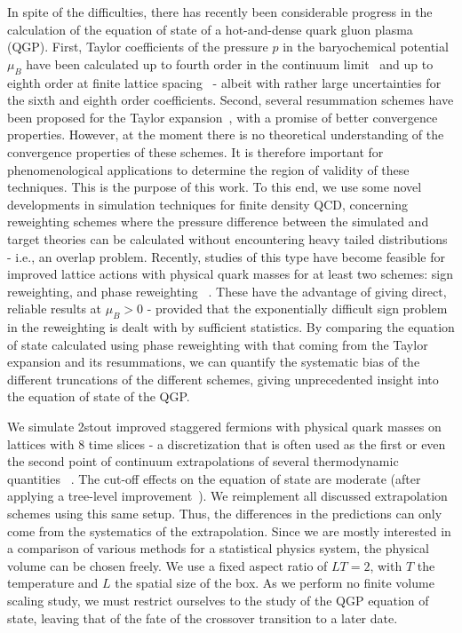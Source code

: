\documentclass[twocolumn,showpacs,preprintnumbers,amsmath,amssymb,latexsym,prl,footinbib,floatfix,superscriptaddress]{revtex4-2}
\begin{document}
In spite of the difficulties, there has recently been considerable 
progress in the calculation of the equation of state 
of a hot-and-dense quark gluon plasma (QGP). First, Taylor 
coefficients of the pressure $p$ in the baryochemical potential
$\mu_B$ have been calculated up to fourth order in the 
continuum limit~\cite{Borsanyi:2012cr, Bellwied:2015lba, Bazavov:2017dus} and 
up to eighth order at finite lattice 
spacing~\cite{DElia:2016jqh,Borsanyi:2018grb,Bazavov:2020bjn} - albeit 
with rather large uncertainties for the sixth and eighth order coefficients. 
Second, several resummation schemes have been proposed  
for the Taylor 
expansion~\cite{Borsanyi:2021sxv,Mondal:2021jxk,Mitra:2022vtf,Bollweg:2022rps,
Borsanyi:2022qlh}, with a promise of better convergence 
properties. However, at the moment there is no
theoretical understanding of the convergence properties of these 
schemes.  
It is therefore important for phenomenological applications to 
determine the region of validity of these techniques.
This is the purpose of this work. 
To this end, we use some 
novel developments in simulation techniques 
for finite density QCD, concerning reweighting 
schemes where the pressure difference between the simulated and 
target theories  can be calculated without 
encountering heavy tailed 
distributions - i.e., an overlap problem. Recently, 
studies of this type have become feasible 
for improved lattice actions with physical quark masses 
for at least two schemes: sign 
reweighting, and phase reweighting 
~\cite{Giordano:2020roi, Borsanyi:2021hbk}.
These have the advantage of giving 
direct, reliable results at $\mu_B>0$ - provided that the 
exponentially difficult sign problem in the 
reweighting is dealt with by sufficient statistics. 
By comparing the equation of state calculated using phase 
reweighting with that coming from the Taylor expansion and 
its resummations, we can 
quantify the systematic bias of the different 
truncations of the different schemes,
giving unprecedented insight into the equation of state of 
the QGP. 

We simulate 2stout improved staggered 
fermions with physical quark masses on lattices with 8 
time slices - a discretization that is often used 
as the first or even the second point of continuum 
extrapolations of several thermodynamic quantities
~\cite{Aoki:2006we,Aoki:2006br,Borsanyi:2010cj,Bali:2011qj,
  Bali:2012zg,Borsanyi:2015yka,Bonati:2015bha,Brandt:2017oyy,
  Bonati:2018nut,DElia:2019iis}. The cut-off effects on the equation of state
  are moderate (after applying a tree-level 
  improvement~\cite{Borsanyi:2010cj}).
We reimplement all discussed extrapolation schemes using this same
setup. Thus, the differences in the predictions can only come from
the systematics of the extrapolation. 
Since we are mostly interested in a comparison of various methods for a statistical 
physics system, the physical volume can be chosen freely. We use a fixed aspect ratio
of $LT=2$, with $T$ the temperature and $L$ the spatial size of the box.
As we perform no finite volume scaling study, we must restrict ourselves to the 
study of the QGP equation of state, leaving that of the 
fate of the crossover transition to a later date.
\end{document}
